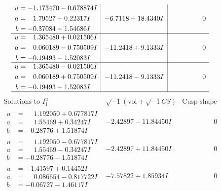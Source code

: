 \documentclass[1p]{elsarticle_modified}
\theoremstyle{definition}
\newcommand{\I}{\sqrt{-1}}
\begin{document}
$$\begin{array}{c|c|c}
\begin{aligned}
u &= -1.173470 - 0.678874 I \\
a &= \phantom{-}1.79527 + 0.22317 I \\
b &= -0.37084 + 1.54686 I\end{aligned}
 & -6.7118 - 18.4340 I & \phantom{-0.000000 } 0 \\ \hline\begin{aligned}
u &= \phantom{-}1.365480 + 0.021506 I \\
a &= \phantom{-}0.060189 - 0.750509 I \\
b &= -0.19493 - 1.52083 I\end{aligned}
 & -11.2418 + 9.1333 I & \phantom{-0.000000 } 0 \\ \hline\begin{aligned}
u &= \phantom{-}1.365480 - 0.021506 I \\
a &= \phantom{-}0.060189 + 0.750509 I \\
b &= -0.19493 + 1.52083 I\end{aligned}
 & -11.2418 - 9.1333 I & \phantom{-0.000000 } 0\\
 \hline 
 \end{array}$$\newpage$$\begin{array}{c|c|c}  
\text{Solutions to }I^u_{1}& \I (\text{vol} + \sqrt{-1}CS) & \text{Cusp shape}\\
 \hline 
\begin{aligned}
u &= \phantom{-}1.192050 + 0.677817 I \\
a &= \phantom{-}1.55469 + 0.34247 I \\
b &= -0.28776 + 1.51874 I\end{aligned}
 & -2.42897 - 11.84450 I & \phantom{-0.000000 } 0 \\ \hline\begin{aligned}
u &= \phantom{-}1.192050 - 0.677817 I \\
a &= \phantom{-}1.55469 - 0.34247 I \\
b &= -0.28776 - 1.51874 I\end{aligned}
 & -2.42897 + 11.84450 I & \phantom{-0.000000 } 0 \\ \hline\begin{aligned}
u &= -1.41597 + 0.14452 I \\
a &= \phantom{-}0.086654 - 0.817722 I \\
b &= -0.06727 - 1.46117 I\end{aligned}
 & -7.57822 + 1.85934 I & \phantom{-0.000000 } 0 \\ \hline\begin{aligned}

\end{aligned}
\end{array}$$
\end{document}
